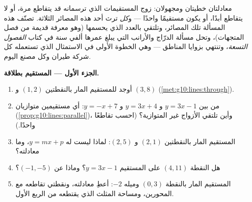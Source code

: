 \begin{problem}
\label{pb:g10:lines:1}
معادلتان خطيتان ومجهولان: زوج المستقيمات الذي ترسمانه
قد يتقاطع مرة، أو لا يتقاطع أبدًا، أو يكون مستقيمًا واحدًا ---
و\emph{كل}  ترث أحد هذه المصائر الثلاثة.
تصنّف هذه المسألة تلك المصائر، وتلتقي بالعدد الذي يحسمها (وهو
معرفة قديمة من فصل المتجهات)، وتحل مسألة
الدرّاج والأرانب التي يبلغ عمرها ألفي سنة في
كتاب \emph{الفصول التسعة}، وتنتهي بزوايا المناطق --- وهي
الخطوة الأولى في الاستمثال الذي تستعمله كل شركة طيران وكل مصنع
اليوم.

\medskip
\noindent\textbf{الجزء الأول --- المستقيم بطلاقة.}
\begin{enumerate}
  \item أوجد  للمستقيم المار بالنقطتين
        $(1, 2)$ و $(3, 8)$
        (\cref{met:g10:lines:through}).
  \item من بين $y = 3x - 1$ و $y = 3x + 4$ و $y = -x + 7$: أي
        مستقيمين متوازيان
        (\cref{prop:g10:lines:parallel})، وأين تلتقي الأزواج
        غير المتوازية؟ (احسب تقاطعًا واحدًا.)
  \item المستقيم المار بالنقطتين $(2, 1)$ و $(2, 5)$: لماذا ليست له
         $y = mx + p$، وما
        معادلته؟
  \item هل النقطة $(4, 11)$ على المستقيم $y = 3x - 1$؟ وماذا عن
        $(-1, -5)$؟
  \item المستقيم المار بالنقطة $(0, 3)$ وميله $-2$: أعطِ
        معادلته، ونقطتي تقاطعه مع المحورين، ومساحة
        المثلث الذي يقتطعه من الربع الأول.
\end{enumerate}


\end{problem}
